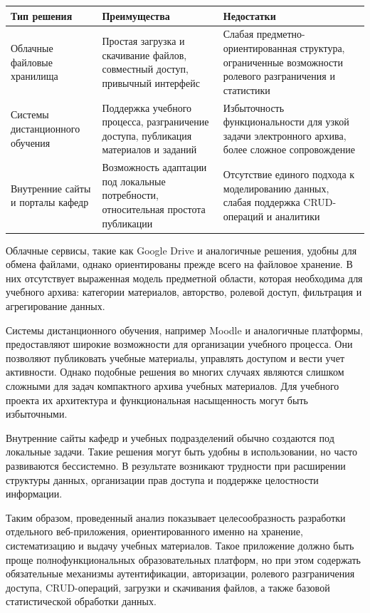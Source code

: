 \documentclass[14pt,a4paper]{extarticle}
\begin{document}
\begin{center}
\begin{tabularx}{0.96\textwidth}{>{\raggedright\arraybackslash}p{3.8cm} >{\raggedright\arraybackslash}X >{\raggedright\arraybackslash}X}
\toprule
\textbf{Тип решения} & \textbf{Преимущества} & \textbf{Недостатки} \\
\midrule
Облачные файловые хранилища & Простая загрузка и скачивание файлов, совместный доступ, привычный интерфейс & Слабая предметно-ориентированная структура, ограниченные возможности ролевого разграничения и статистики \\
Системы дистанционного обучения & Поддержка учебного процесса, разграничение доступа, публикация материалов и заданий & Избыточность функциональности для узкой задачи электронного архива, более сложное сопровождение \\
Внутренние сайты и порталы кафедр & Возможность адаптации под локальные потребности, относительная простота публикации & Отсутствие единого подхода к моделированию данных, слабая поддержка CRUD-операций и аналитики \\
\bottomrule
\end{tabularx}
\end{center}

Облачные сервисы, такие как Google Drive и аналогичные решения, удобны для обмена файлами, однако ориентированы прежде всего на файловое хранение. В них отсутствует выраженная модель предметной области, которая необходима для учебного архива: категории материалов, авторство, ролевой доступ, фильтрация и агрегирование данных.

Системы дистанционного обучения, например Moodle и аналогичные платформы, предоставляют широкие возможности для организации учебного процесса. Они позволяют публиковать учебные материалы, управлять доступом и вести учет активности. Однако подобные решения во многих случаях являются слишком сложными для задач компактного архива учебных материалов. Для учебного проекта их архитектура и функциональная насыщенность могут быть избыточными.

Внутренние сайты кафедр и учебных подразделений обычно создаются под локальные задачи. Такие решения могут быть удобны в использовании, но часто развиваются бессистемно. В результате возникают трудности при расширении структуры данных, организации прав доступа и поддержке целостности информации.

Таким образом, проведенный анализ показывает целесообразность разработки отдельного веб-приложения, ориентированного именно на хранение, систематизацию и выдачу учебных материалов. Такое приложение должно быть проще полнофункциональных образовательных платформ, но при этом содержать обязательные механизмы аутентификации, авторизации, ролевого разграничения доступа, CRUD-операций, загрузки и скачивания файлов, а также базовой статистической обработки данных.
\end{document}
